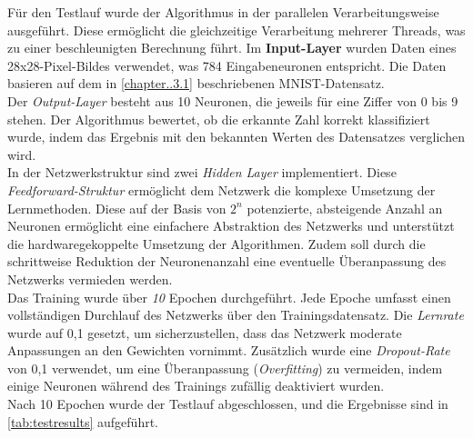 \documentclass[a4paper, 12pt]{article}
\begin{document}
Für den Testlauf wurde der Algorithmus in der parallelen Verarbeitungsweise ausgeführt. Diese 
ermöglicht die gleichzeitige Verarbeitung mehrerer Threads, was zu einer beschleunigten Berechnung 
führt. Im \textbf{Input-Layer} wurden Daten eines 28x28-Pixel-Bildes verwendet, was 784 
Eingabeneuronen entspricht. Die Daten basieren auf dem in \autoref{chapter..3.1} beschriebenen 
MNIST-Datensatz.\\
Der \textit{Output-Layer} besteht aus 10 Neuronen, die jeweils für eine Ziffer von 0 bis 9 stehen. 
Der Algorithmus bewertet, ob die erkannte Zahl korrekt klassifiziert wurde, indem das Ergebnis mit 
den bekannten Werten des Datensatzes verglichen wird.\\
In der Netzwerkstruktur sind zwei \textit{Hidden Layer} implementiert. Diese \textit{Feedforward-Struktur}
ermöglicht dem Netzwerk die komplexe Umsetzung der Lernmethoden. Diese auf der Basis von \(2^n\) 
potenzierte, absteigende Anzahl an Neuronen ermöglicht eine einfachere Abstraktion des Netzwerks und 
unterstützt die hardwaregekoppelte Umsetzung der Algorithmen. Zudem soll durch die schrittweise 
Reduktion der Neuronenanzahl eine eventuelle Überanpassung des Netzwerks vermieden werden.\\
Das Training wurde über \textit{10} Epochen durchgeführt. Jede Epoche umfasst einen vollständigen 
Durchlauf des Netzwerks über den Trainingsdatensatz. Die \textit{Lernrate} wurde auf 0,1 gesetzt, 
um sicherzustellen, dass das Netzwerk moderate Anpassungen an den Gewichten vornimmt. Zusätzlich 
wurde eine \textit{Dropout-Rate} von 0,1 verwendet, um eine Überanpassung (\textit{Overfitting}) zu 
vermeiden, indem einige Neuronen während des Trainings zufällig deaktiviert wurden.\\
Nach 10 Epochen wurde der Testlauf abgeschlossen, und die Ergebnisse sind in 
\autoref{tab:testresults} aufgeführt.
\end{document}
